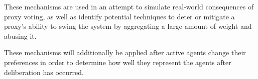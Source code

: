 \begin{enumerate}
\end{enumerate}
These mechanisms are used in an attempt to simulate real-world consequences of proxy
voting, as well as identify potential techniques to deter or mitigate a proxy's
ability to swing the system by aggregating a large amount of weight and abusing it.

These mechanisms will additionally be applied after active agents change their
preferences in order to determine how well they represent the agents after
deliberation has occurred.
